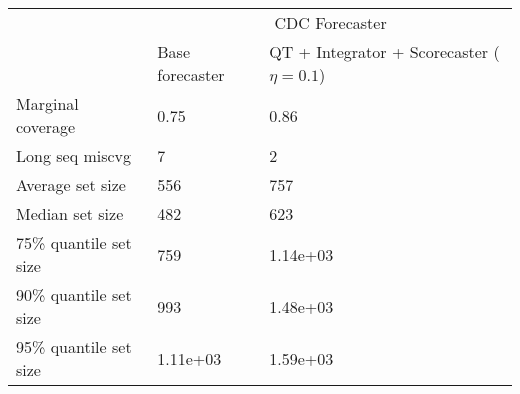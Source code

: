 \begin{tabular}{lll}
\toprule
& \multicolumn{2}{c}{CDC Forecaster} \\
& Base forecaster & QT + Integrator + Scorecaster ($\eta=0.1$) \\
\midrule
Marginal coverage & 0.75 & 0.86 \\
Long seq miscvg & 7 & 2 \\
Average set size & 556 & 757 \\
Median set size & 482 & 623 \\
75\% quantile set size & 759 & 1.14e+03 \\
90\% quantile set size & 993 & 1.48e+03 \\
95\% quantile set size & 1.11e+03 & 1.59e+03 \\
\bottomrule
\end{tabular}
